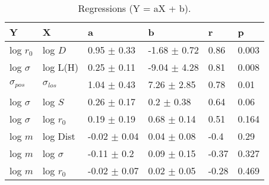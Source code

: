 \begin{table}
\centering
\caption{Regressions (Y = aX + b).}
\begin{tabular}{llllll}
\toprule
              Y &               X &                 a &                 b &      r &      p \\
\midrule
      log $r_0$ &         log $D$ &   0.95 $\pm$ 0.33 &  -1.68 $\pm$ 0.72 &   0.86 &  0.003 \\
   log $\sigma$ &        log L(H) &   0.25 $\pm$ 0.11 &  -9.04 $\pm$ 4.28 &   0.81 &  0.008 \\
 $\sigma_{pos}$ &  $\sigma_{los}$ &   1.04 $\pm$ 0.43 &   7.26 $\pm$ 2.85 &   0.78 &   0.01 \\
   log $\sigma$ &         log $S$ &   0.26 $\pm$ 0.17 &    0.2 $\pm$ 0.38 &   0.64 &   0.06 \\
   log $\sigma$ &     log $r_{0}$ &   0.19 $\pm$ 0.19 &   0.68 $\pm$ 0.14 &   0.51 &  0.164 \\
        log $m$ &        log Dist &  -0.02 $\pm$ 0.04 &   0.04 $\pm$ 0.08 &   -0.4 &   0.29 \\
        log $m$ &    log $\sigma$ &   -0.11 $\pm$ 0.2 &   0.09 $\pm$ 0.15 &  -0.37 &  0.327 \\
        log $m$ &     log $r_{0}$ &  -0.02 $\pm$ 0.07 &   0.02 $\pm$ 0.05 &  -0.28 &  0.469 \\
\bottomrule
\end{tabular}
\end{table}
